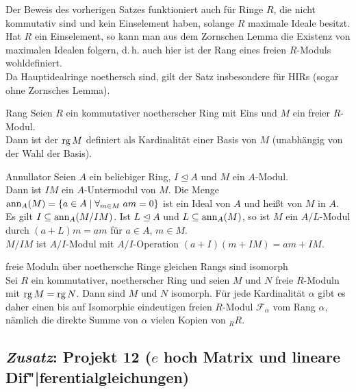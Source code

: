\begin{Bem}
    Der Beweis des vorherigen Satzes funktioniert auch für Ringe $R$, die
    nicht kommutativ sind und kein Einselement haben, solange $R$ maximale
    Ideale besitzt. \\
    Hat $R$ ein Einselement, so kann man aus dem Zornschen Lemma die Existenz
    von maximalen Idealen folgern, d.\,h. auch hier ist der Rang eines freien
    $R$-Moduls wohldefiniert. \\
    Da Hauptidealringe noethersch sind, gilt der Satz insbesondere für HIRs
    (sogar ohne Zornsches Lemma).
\end{Bem}

\begin{Def}{Rang}
    Seien $R$ ein kommutativer noetherscher Ring mit Eins und $M$ ein
    freier $R$-Modul. \\
    Dann ist der  $\operatorname{rg} M$ definiert als Kardinalität einer
    Basis von $M$ (unabhängig von der Wahl der Basis).
\end{Def}

\begin{Lemma}{Annullator}
    Seien $A$ ein beliebiger Ring, $I \trianglelefteq A$ und $M$ ein
    $A$-Modul. \\
    Dann ist $I M$ ein $A$-Untermodul von $M$.
    Die Menge $\operatorname{ann}_A(M) = \{a \in A \;|\; \forall_{m \in M}\; am = 0\}$
    ist ein Ideal von $A$ und heißt  von $M$ in $A$.
    Es gilt $I \subseteq \operatorname{ann}_A(M/IM)$.
    Ist $L \trianglelefteq A$ und $L \subseteq \operatorname{ann}_A(M)$, so ist
    $M$ ein $A/L$-Modul durch $(a + L)m = am$ für $a \in A$, $m \in M$. \\
    $M/IM$ ist $A/I$-Modul mit $A/I$-Operation
    $(a + I)(m + IM) = am + IM$.
\end{Lemma}

\begin{Satz}{freie Moduln über noethersche Ringe gleichen Rangs sind
             isomorph} \\
    Sei $R$ ein kommutativer, noetherscher Ring und seien $M$ und $N$
    freie $R$-Moduln mit $\operatorname{rg} M = \operatorname{rg} N$.
    Dann sind $M$ und $N$ isomorph.
    Für jede Kardinalität $\alpha$ gibt es daher einen bis auf Isomorphie
    eindeutigen freien $R$-Modul $\mathcal{F}_\alpha$ vom Rang $\alpha$,
    nämlich die direkte Summe von $\alpha$ vielen Kopien von ${}_R R$.
\end{Satz}

\pagebreak

\subsection{%
    \emph{Zusatz}: Projekt 12 (\texorpdfstring{$e$}{ℯ} hoch Matrix und
    lineare Dif"|ferentialgleichungen)%
}

